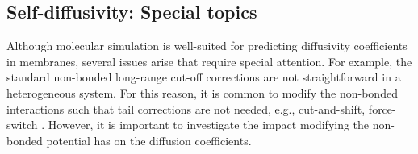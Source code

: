 \documentclass[9pt,bestpractices]{livecoms}
\begin{document}

\subsection{Self-diffusivity: Special topics} \label{sec:Self-Diffusivity Special topics}

Although molecular simulation is well-suited for predicting diffusivity coefficients in membranes, several issues arise that require special attention. For example, the standard non-bonded long-range cut-off corrections are not straightforward in a heterogeneous system. For this reason, it is common to modify the non-bonded interactions such that tail corrections are not needed, e.g., cut-and-shift, force-switch \cite{GROMACS,Brooks2009}. However, it is important to investigate the impact modifying the non-bonded potential has on the diffusion coefficients. 
\end{document}
